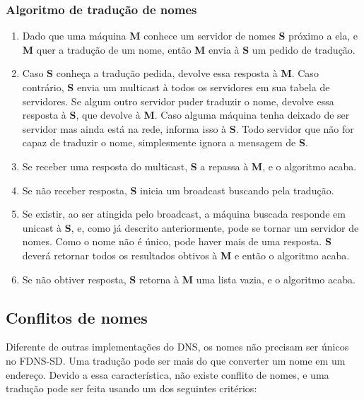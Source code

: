     \subsubsection{Algoritmo de tradução de nomes}
        \begin{enumerate}
            \item Dado que uma máquina \textbf{M} conhece um servidor de nomes
            \textbf{S} próximo a ela, e \textbf{M} quer a tradução de um nome,
            então \textbf{M} envia à \textbf{S} um pedido de tradução.
            \item Caso \textbf{S} conheça a tradução pedida, devolve essa resposta
            à \textbf{M}. Caso contrário, \textbf{S} envia um multicast à todos
            os servidores em sua tabela de servidores. Se algum outro servidor
            puder traduzir o nome, devolve essa resposta à \textbf{S}, que devolve
            à \textbf{M}. Caso alguma máquina tenha deixado de ser servidor mas
            ainda está na rede, informa isso à \textbf{S}. Todo servidor que não
            for capaz de traduzir o nome, simplesmente ignora a mensagem de \textbf{S}.
            \item Se receber uma resposta do multicast, \textbf{S} a repassa à
            \textbf{M}, e o algoritmo acaba.
            \item Se não receber resposta, \textbf{S} inicia um broadcast buscando
            pela tradução. 
            \item Se existir, ao ser atingida pelo broadcast, a máquina buscada
            responde em unicast à \textbf{S}, e, como já descrito anteriormente,
            pode se tornar um servidor de nomes. Como o nome não é único, pode
            haver mais de uma resposta. \textbf{S} deverá retornar todos os
            resultados obtivos à \textbf{M} e então o algoritmo acaba.
            \item Se não obtiver resposta, \textbf{S} retorna à \textbf{M} uma
            lista vazia, e o algoritmo acaba.
        \end{enumerate}

\subsection{Conflitos de nomes}
    Diferente de outras implementações do DNS, os nomes não precisam ser únicos
    no FDNS-SD. Uma tradução pode ser mais do que converter um nome em um endereço.
    Devido a essa característica, não existe conflito de nomes, e uma tradução pode
    ser feita usando um dos seguintes critérios:
    
